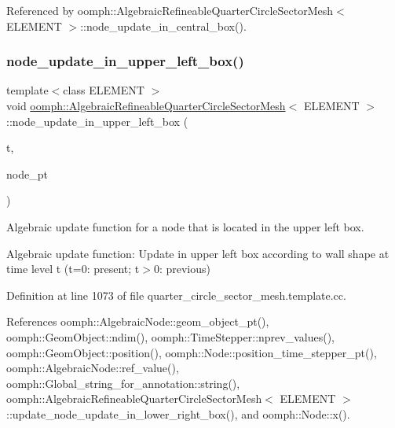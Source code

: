 Referenced by oomph\+::\+Algebraic\+Refineable\+Quarter\+Circle\+Sector\+Mesh$<$ E\+L\+E\+M\+E\+N\+T $>$\+::node\+\_\+update\+\_\+in\+\_\+central\+\_\+box().

\mbox{\label{classoomph_1_1AlgebraicRefineableQuarterCircleSectorMesh_aeb36f6747d14cd68d4857169fa0f22d1}} 
\subsubsection{\texorpdfstring{node\+\_\+update\+\_\+in\+\_\+upper\+\_\+left\+\_\+box()}{node\_update\_in\_upper\_left\_box()}}
{\footnotesize\ttfamily template$<$class E\+L\+E\+M\+E\+NT $>$ \\
void \hyperlink{classoomph_1_1AlgebraicRefineableQuarterCircleSectorMesh}{oomph\+::\+Algebraic\+Refineable\+Quarter\+Circle\+Sector\+Mesh}$<$ E\+L\+E\+M\+E\+NT $>$\+::node\+\_\+update\+\_\+in\+\_\+upper\+\_\+left\+\_\+box (\begin{DoxyParamCaption}\item[{const unsigned \&}]{t,  }\item[{\hyperlink{classoomph_1_1AlgebraicNode}{Algebraic\+Node} $\ast$\&}]{node\+\_\+pt }\end{DoxyParamCaption})\hspace{0.3cm}{\ttfamily [private]}}



Algebraic update function for a node that is located in the upper left box. 

Algebraic update function\+: Update in upper left box according to wall shape at time level t (t=0\+: present; t$>$0\+: previous) 

Definition at line 1073 of file quarter\+\_\+circle\+\_\+sector\+\_\+mesh.\+template.\+cc.



References oomph\+::\+Algebraic\+Node\+::geom\+\_\+object\+\_\+pt(), oomph\+::\+Geom\+Object\+::ndim(), oomph\+::\+Time\+Stepper\+::nprev\+\_\+values(), oomph\+::\+Geom\+Object\+::position(), oomph\+::\+Node\+::position\+\_\+time\+\_\+stepper\+\_\+pt(), oomph\+::\+Algebraic\+Node\+::ref\+\_\+value(), oomph\+::\+Global\+\_\+string\+\_\+for\+\_\+annotation\+::string(), oomph\+::\+Algebraic\+Refineable\+Quarter\+Circle\+Sector\+Mesh$<$ E\+L\+E\+M\+E\+N\+T $>$\+::update\+\_\+node\+\_\+update\+\_\+in\+\_\+lower\+\_\+right\+\_\+box(), and oomph\+::\+Node\+::x().



